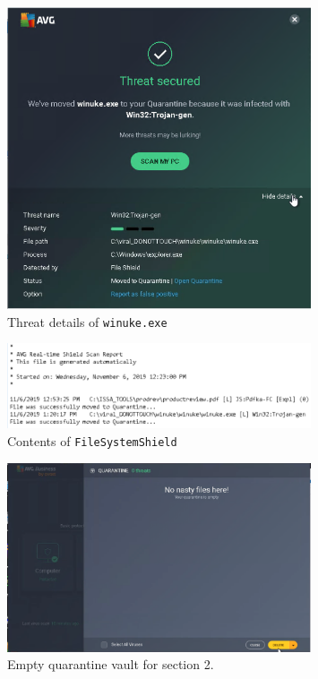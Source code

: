 \documentclass[a4paper]{article}
\begin{document}
	\begin{figure}[ht!]
		\centering
		\includegraphics[width=0.8\textwidth]{2_2_5}
		\caption{Threat details of \verb|winuke.exe|}
		\label{fig:2_2_5}
	\end{figure}

	\begin{figure}[ht!]
		\centering
		\includegraphics[width=0.8\textwidth]{2_2_8}
		\caption{Contents of \verb|FileSystemShield|}
		\label{fig:2_2_8}
	\end{figure}

	\begin{figure}[ht!]
		\centering
		\includegraphics[width=0.8\textwidth]{2_3_3}
		\caption{Empty quarantine vault for section 2.}
		\label{fig:2_3_3}
	\end{figure}
\end{document}
